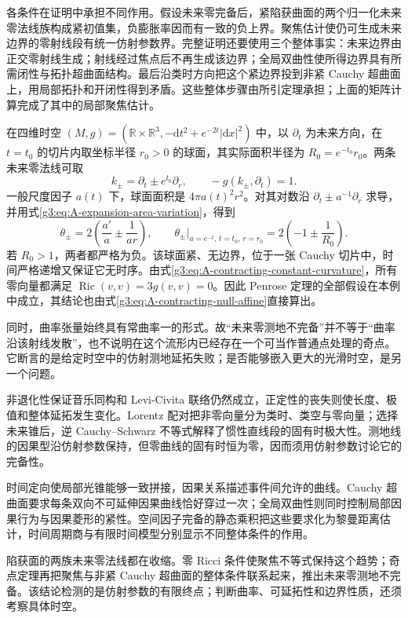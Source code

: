 \ProseParagraphBreak
各条件在证明中承担不同作用。假设未来零完备后，紧陷获曲面的两个归一化未来零法线族构成紧初值集，负膨胀率因而有一致的负上界。聚焦估计使仍可生成未来边界的零射线段有统一仿射参数界。完整证明还要使用三个整体事实：未来边界由正交零射线生成；射线经过焦点后不再生成该边界；全局双曲性使所得边界具有所需闭性与拓扑超曲面结构。最后沿类时方向把这个紧边界投到非紧 Cauchy 超曲面上，用局部拓扑和开闭性得到矛盾。这些整体步骤由所引定理承担；上面的矩阵计算完成了其中的局部聚焦估计。

\begin{example}\label{g3:exm:A-contracting-trapped-sphere}
	在四维时空 \((M,g)=(\mathbb R\times\mathbb R^3,-\mathrm dt^2+e^{-2t}|\mathrm dx|^2)\) 中，以 \(\partial_t\) 为未来方向，在 \(t=t_0\) 的切片内取坐标半径 \(r_0>0\) 的球面，其实际面积半径为 \(R_0=e^{-t_0}r_0\)。两条未来零法线可取
	\[
		k_\pm=\partial_t\pm e^{t_0}\partial_r,
		\qquad -g(k_\pm,\partial_t)=1.
	\]
	一般尺度因子 \(a(t)\) 下，球面面积是 \(4\pi a(t)^2r^2\)。对其对数沿 \(\partial_t\pm a^{-1}\partial_r\) 求导，并用式\eqref{g3:eq:A-expansion-area-variation}，得到
	\begin{equation}\label{g3:eq:A-contracting-sphere-expansion}
		\theta_\pm
		=2\left(\frac{a'}a\pm\frac1{ar}\right),
		\qquad
		\theta_\pm\big|_{a=e^{-t},\,t=t_0,\,r=r_0}
		=2\left(-1\pm\frac1{R_0}\right).
	\end{equation}
	若 \(R_0>1\)，两者都严格为负。该球面紧、无边界，位于一张 Cauchy 切片中，时间严格递增又保证它无时序。由式\eqref{g3:eq:A-contracting-constant-curvature}，所有零向量都满足 \(\operatorname{Ric}(v,v)=3g(v,v)=0\)。因此 Penrose 定理的全部假设在本例中成立，其结论也由式\eqref{g3:eq:A-contracting-null-affine}直接算出。

	同时，曲率张量始终具有常曲率一的形式。故“未来零测地不完备”并不等于“曲率沿该射线发散”，也不说明在这个流形内已经存在一个可当作普通点处理的奇点。它断言的是给定时空中的仿射测地延拓失败；是否能够嵌入更大的光滑时空，是另一个问题。
\end{example}

\begin{chaptersummary}
	非退化性保证音乐同构和 Levi-Civita 联络仍然成立，正定性的丧失则使长度、极值和整体延拓发生变化。Lorentz 配对把非零向量分为类时、类空与零向量；选择未来锥后，逆 Cauchy--Schwarz 不等式解释了惯性直线段的固有时极大性。测地线的因果型沿仿射参数保持，但零曲线的固有时恒为零，因而须用仿射参数讨论它的完备性。

	\ProseParagraphBreak
	时间定向使局部光锥能够一致拼接，因果关系描述事件间允许的曲线。Cauchy 超曲面要求每条双向不可延伸因果曲线恰好穿过一次；全局双曲性则同时控制局部因果行为与因果菱形的紧性。空间因子完备的静态乘积把这些要求化为黎曼距离估计，时间周期商与有限时间模型分别显示不同整体条件的作用。

	\ProseParagraphBreak
	陷获面的两族未来零法线都在收缩。零 Ricci 条件使聚焦不等式保持这个趋势；奇点定理再把聚焦与非紧 Cauchy 超曲面的整体条件联系起来，推出未来零测地不完备。该结论检测的是仿射参数的有限终点；判断曲率、可延拓性和边界性质，还须考察具体时空。
\end{chaptersummary}

